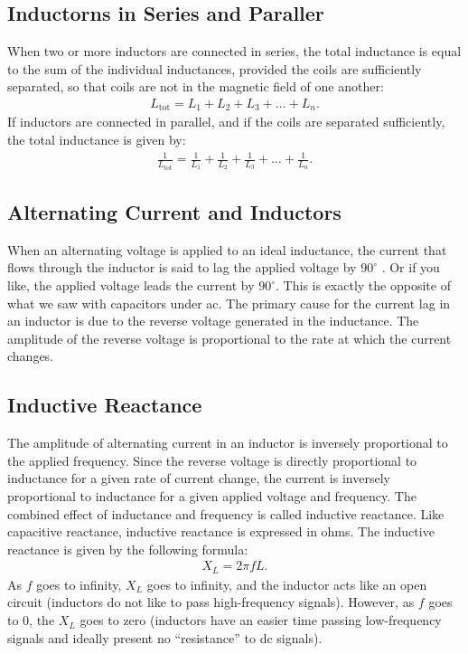 \documentclass[../../document]{subfiles}
\begin{document}
\subsection{Inductorns in Series and Paraller}
When two or more inductors are connected in series, the total inductance is
equal to the sum of the individual inductances, provided the coils are
sufficiently separated, so that coils are not in the magnetic field of one
another:
\begin{gather}
	L_{\text{tot}} = L_1+L_2+L_3+\dots+L_n. \tag{Inductors in series}
\end{gather}
If inductors are connected in parallel, and if the coils are separated
sufficiently, the total inductance is given by: \cite{practical_electronics}
\begin{gather}
	\frac{1}{L_{\text{tot}}} =
	\frac{1}{L_1}+\frac{1}{L_2}+\frac{1}{L_3}+\dots+\frac{1}{L_n}. \tag{Inductors
	in parallel}
\end{gather}

\subsection{Alternating Current and Inductors}
When an alternating voltage is applied to an ideal inductance, the current that
flows through the inductor is said to lag the applied voltage by \(90^\circ\) .
Or if you like, the applied voltage leads the current by \(90^\circ\). This is
exactly the opposite of what we saw with capacitors under ac. The primary cause
for the current lag in an inductor is due to the reverse voltage generated in
the inductance. The amplitude of the reverse voltage is proportional to the
rate at which the current changes. \cite{practical_electronics}

\subsection{Inductive Reactance}
The amplitude of alternating current in an inductor is inversely proportional
to the applied frequency. Since the reverse voltage is directly proportional to
inductance for a given rate of current change, the current is inversely
proportional to inductance for a given applied voltage and frequency. The
combined effect of inductance and frequency is called inductive reactance. Like
capacitive reactance, inductive reactance is expressed in ohms. The inductive
reactance is given by the following formula:
\begin{gather}
	X_L = 2\pi fL. \tag{Inductive reactance}
\end{gather}
As \(f\)  goes to infinity, \(X_L\) goes to infinity, and the inductor acts
like an open circuit (inductors do not like to pass high-frequency signals).
However, as \(f\) goes to 0, the \(X_L\) goes to zero (inductors have an easier
time passing low-frequency signals and ideally present no \enquote{resistance}
to dc signals). \cite{practical_electronics}
\end{document}

